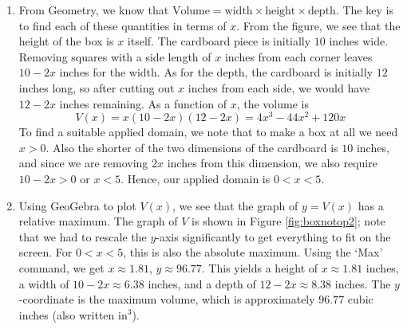 {
\begin{enumerate}

\item  From Geometry, we know that $\mbox{Volume} = \mbox{width} \times \mbox{height} \times \mbox{depth}$.  The key is to find each of these quantities in terms of $x$.  From the figure, we see that the height of the box is $x$ itself.  The cardboard piece is initially $10$ inches wide.  Removing squares with a side length of $x$ inches from each corner leaves $10-2x$ inches for the width. As for the depth, the cardboard is initially $12$ inches long, so after cutting out $x$ inches from each side, we would have $12-2x$ inches remaining.   As a function of $x$, the volume is \[V(x) = x(10-2x)(12-2x) = 4x^3-44x^2+120x\] To find a suitable applied domain, we note that to make a box at all we need $x > 0$.  Also the shorter of the two dimensions of the cardboard is $10$ inches, and since we are removing $2x$ inches from this dimension, we also require $10 - 2x > 0$ or $x < 5$.  Hence, our applied domain is $0 < x < 5$.




\item  Using GeoGebra to plot $V(x)$, we see that the graph of $y=V(x)$ has a relative maximum. The graph of $V$ is shown in Figure \ref{fig:boxnotop2}; note that we had to rescale the $y$-axis significantly to get everything to fit on the screen.  For $0 < x < 5$, this is also the absolute maximum.  Using the `Max' command, we get $x \approx 1.81$, $y \approx 96.77$.  This yields a height of $x \approx 1.81$ inches, a width of $10 - 2x \approx 6.38$ inches, and a depth of $12 - 2x \approx 8.38$ inches.  The $y$-coordinate is the maximum volume, which is approximately $96.77$ cubic inches (also written $\mbox{in}^3$). 
\end{enumerate}
}


